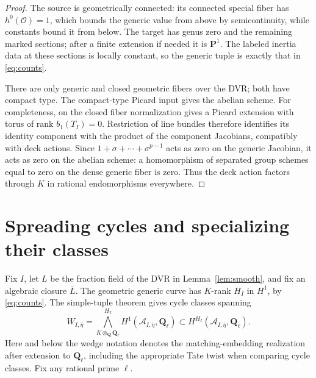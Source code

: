 \documentclass[11pt]{article}
\theoremstyle{definition}
\newcommand{\Q}{\mathbf Q}
\begin{document}
\begin{proof}
The source is geometrically connected: its connected special fiber has
$h^0(\mathcal O)=1$, which bounds the generic value from above by
semicontinuity, while constants bound it from below. The target has genus
zero and the remaining marked sections; after a finite extension if needed
it is $\mathbf P^1$. The labeled inertia data at these sections is locally
constant, so the generic tuple is exactly that in \eqref{eq:counts}.

There are only generic and closed geometric fibers over the DVR; both have
compact type. The compact-type Picard input gives the abelian scheme. For
completeness, on the closed fiber normalization gives a Picard extension with
torus of rank $b_1(T_I)=0$. Restriction of line bundles therefore identifies
its identity component with the product of the component Jacobians, compatibly
with deck actions. Since $1+\sigma+\cdots+\sigma^{p-1}$ acts as zero on the
generic Jacobian, it acts as zero on the abelian scheme: a homomorphism of
separated group schemes equal to zero on the dense generic fiber is zero.
Thus the deck action factors through $K$ in rational endomorphisms everywhere.
\end{proof}

\section{Spreading cycles and specializing their classes}\label{sec:specialize}
Fix $I$, let $L$ be the fraction field of the DVR in
Lemma~\ref{lem:smooth}, and fix an algebraic closure $\overline L$. The
geometric generic curve has $K$-rank $H_I$ in $H^1$, by
\eqref{eq:counts}. The simple-tuple theorem gives cycle classes spanning
\[
 W_{I,\overline\eta}
 =\bigwedge_{K\otimes_\Q\Q_\ell}^{H_I}
       H^1(\mathcal A_{I,\overline\eta},\Q_\ell)
 \subset H^{H_I}(\mathcal A_{I,\overline\eta},\Q_\ell).
\]
Here and below the wedge notation denotes the matching-embedding realization
after extension to $\Q_\ell$, including the appropriate Tate twist when
comparing cycle classes. Fix any rational prime $\ell$.
\end{document}

